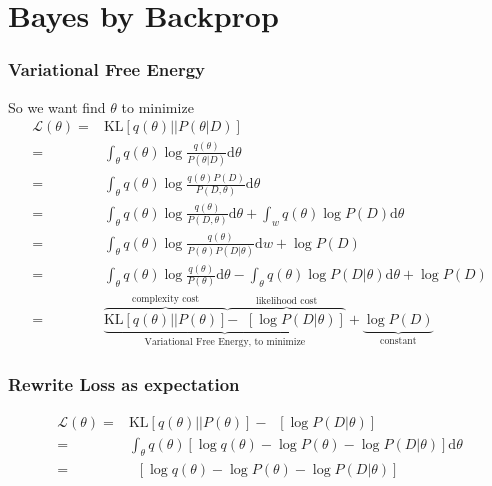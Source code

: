\section{Bayes by Backprop}


\begin{frame}
  \frametitle{Variational Free Energy}
  So we want find $\theta$ to minimize
  \begin{align*}
    \mathcal{L}(\theta)
    =& \mathrm{KL}[q(\theta) || P(\theta | D)] \\
    =& \int_\theta q(\theta) \log \frac{q(\theta)}{P(\theta | D)} \mathrm{d} \theta \\
    =& \int_\theta q(\theta) \log \frac{q(\theta) P(D)}{P(D, \theta)} \mathrm{d} \theta \\
    =& \int_\theta q(\theta) \log \frac{q(\theta)}{P(D, \theta)} \mathrm{d} \theta +
       \int_w q(\theta) \log P(D) \mathrm{d} \theta\\
    =& \int_\theta q(\theta) \log \frac{q(\theta)}{P(\theta) P(D | \theta)} \mathrm{d} w + \log P(D) \\
    =& \int_\theta q(\theta) \log \frac{q(\theta)}{P(\theta)} \mathrm{d} \theta
       - \int_\theta q(\theta) \log P(D | \theta) \mathrm{d} \theta + \log P(D) \\
    =& \underbrace{
       \overbrace{\mathrm{KL}[q(\theta) || P(\theta)]}^{\text{complexity cost}}
       \overbrace{-\mathop{\mathbb{E}_{q(\theta)}}[\log P(D | \theta)]}^{\text{likelihood cost}}
       }_{\text{Variational Free Energy, to minimize}}
       + \underbrace{\log P(D)}_{\text{constant}}
  \end{align*}
\end{frame}


\begin{frame}
  \frametitle{Rewrite Loss as expectation}
  \begin{align*}
    \mathcal{L}(\theta) 
    =& \mathrm{KL}[q(\theta) || P(\theta)] - \mathop{\mathbb{E}_{q(\theta)}}[\log P(D | \theta)] \\
    =& \int_\theta q(\theta) [\log q(\theta) - \log P(\theta) - \log P(D | \theta)] \mathrm{d} \theta \\
    =& \mathop{\mathbb{E}_{q(\theta)} }[\log q(\theta) - \log P(\theta) - \log P(D | \theta)]
  \end{align*}
  
\end{frame}


